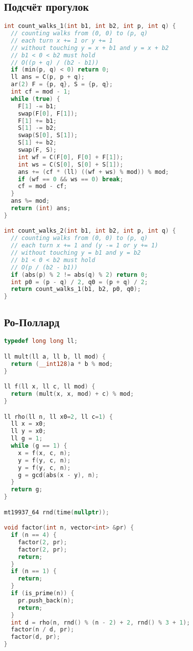 \documentclass[9pt,a4paper,landscape,twosided]{extarticle}
\begin{document}
\begin{multicols*}{3}
\subsection{Подсчёт прогулок}
\begin{lstlisting}[language=C++]
int count_walks_1(int b1, int b2, int p, int q) {
  // counting walks from (0, 0) to (p, q)
  // each turn x += 1 or y += 1
  // without touching y = x + b1 and y = x + b2
  // b1 < 0 < b2 must hold
  // O((p + q) / (b2 - b1))
  if (min(p, q) < 0) return 0;
  ll ans = C(p, p + q);
  ar(2) F = {p, q}, S = {p, q};
  int cf = mod - 1;
  while (true) {
    F[1] -= b1;
    swap(F[0], F[1]);
    F[1] += b1;
    S[1] -= b2;
    swap(S[0], S[1]);
    S[1] += b2;
    swap(F, S);
    int wf = C(F[0], F[0] + F[1]);
    int ws = C(S[0], S[0] + S[1]);
    ans += (cf * (ll) ((wf + ws) % mod)) % mod;
    if (wf == 0 && ws == 0) break;
    cf = mod - cf;
  }
  ans %= mod;
  return (int) ans;
}

int count_walks_2(int b1, int b2, int p, int q) {
  // counting walks from (0, 0) to (p, q)
  // each turn x += 1 and (y -= 1 or y += 1)
  // without touching y = b1 and y = b2
  // b1 < 0 < b2 must hold
  // O(p / (b2 - b1))
  if (abs(p) % 2 != abs(q) % 2) return 0;
  int p0 = (p - q) / 2, q0 = (p + q) / 2;
  return count_walks_1(b1, b2, p0, q0);
}
\end{lstlisting}

\subsection{Ро-Поллард}
\begin{lstlisting}[language=C++]
typedef long long ll;

ll mult(ll a, ll b, ll mod) {
  return (__int128)a * b % mod;
}

ll f(ll x, ll c, ll mod) {
  return (mult(x, x, mod) + c) % mod;
}

ll rho(ll n, ll x0=2, ll c=1) {
  ll x = x0;
  ll y = x0;
  ll g = 1;
  while (g == 1) {
    x = f(x, c, n);
    y = f(y, c, n);
    y = f(y, c, n);
    g = gcd(abs(x - y), n);
  }
  return g;
}

mt19937_64 rnd(time(nullptr));

void factor(int n, vector<int> &pr) {
  if (n == 4) {
    factor(2, pr);
    factor(2, pr);
    return;
  }
  if (n == 1) {
    return;
  }
  if (is_prime(n)) {
    pr.push_back(n);
    return;
  }
  int d = rho(n, rnd() % (n - 2) + 2, rnd() % 3 + 1);
  factor(n / d, pr);
  factor(d, pr);
}
\end{lstlisting}


\end{multicols*}
\end{document}
